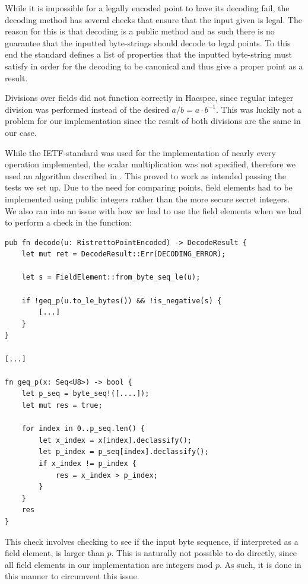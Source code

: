 \documentclass{article}
\newcommand*\ttvar[1]{\texttt{\expandafter\dottvar\detokenize{#1}\relax}}
\newcommand*\dottvar[1]{\ifx\relax#1\else
  \expandafter\ifx\string_#1\string_\allowbreak\else#1\fi
  \expandafter\dottvar\fi}
\begin{document}
While it is impossible for a legally encoded point to have its decoding
fail, the decoding method has several checks that ensure that the input
given is legal. The reason for this is that decoding is a public method
and as such there is no guarantee that the inputted byte-strings should 
decode to legal points. To this end the standard defines a list of 
properties that the inputted byte-string must satisfy in order for the 
decoding to be canonical and thus give a proper point as a result.

Divisions over fields did not function correctly in Hacspec, since regular integer division was performed instead of the desired $a/b = a \cdot b^{-1}$. This was luckily not a problem for our implementation since the result of both divisions are the same in our case.

While the IETF-standard was used for the implementation of nearly every
operation implemented, the scalar multiplication was not specified,
therefore we used an algorithm described in \cite{elliptic-curves}. This
proved to work as intended passing the tests we set up. Due to the
need for comparing points, field elements had to be implemented using
public integers rather than the more secure secret integers. We also
ran into an issue with how we had to use the field elements when we
had to perform a check in the \ttvar{decode()} function:

\begin{lstlisting}
pub fn decode(u: RistrettoPointEncoded) -> DecodeResult {
	let mut ret = DecodeResult::Err(DECODING_ERROR);

	let s = FieldElement::from_byte_seq_le(u);

	if !geq_p(u.to_le_bytes()) && !is_negative(s) {
		[...]
	}
}

[...]

fn geq_p(x: Seq<U8>) -> bool {
	let p_seq = byte_seq!([....]);
	let mut res = true;

	for index in 0..p_seq.len() {
		let x_index = x[index].declassify();
		let p_index = p_seq[index].declassify();
		if x_index != p_index {
			res = x_index > p_index;
		}
	}
	res
}
\end{lstlisting}

This check involves checking to see if the input byte sequence,
if interpreted as a field element, is larger than $p$. This is
naturally not possible to do directly, since all field elements in
our implementation are integers mod $p$. As such, it is done in this
manner to circumvent this issue.
\end{document}
